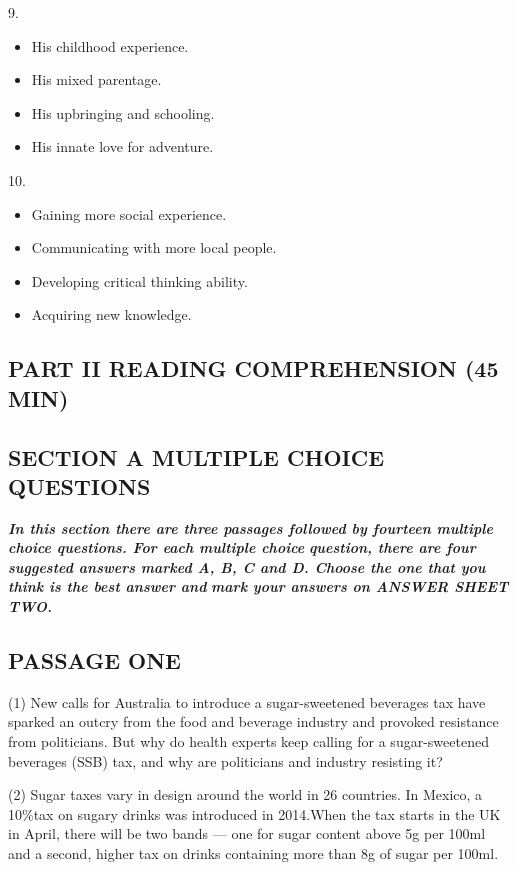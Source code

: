 \documentclass[UTF8,11pt]{ctexart}
\begin{document}
9.


\begin{itemize}[leftmargin=2em,itemsep=.2em,topsep=.4em]\item[A.] His childhood experience.
\item[B.] His mixed parentage.
\item[C.] His upbringing and schooling.
\item[D.] His innate love for adventure.
\end{itemize}

10.


\begin{itemize}[leftmargin=2em,itemsep=.2em,topsep=.4em]\item[A.] Gaining more social experience.
\item[B.] Communicating with more local people.
\item[C.] Developing critical thinking ability.
\item[D.] Acquiring new knowledge.
\end{itemize}

\subsection*{\textbf{PART II READING COMPREHENSION (45 MIN)}}


\subsection*{\textbf{SECTION A MULTIPLE CHOICE QUESTIONS}}


\textbf{\textit{In this section there are three passages followed by fourteen multiple choice questions. For each multiple choice}} \textbf{\textit{question, there are four suggested answers marked A, B, C and D. Choose the one that you think is the best answer and}} \textbf{\textit{mark your answers on ANSWER SHEET TWO.}}


\subsection*{\textbf{PASSAGE ONE}}


(1) New calls for Australia to introduce a sugar-sweetened beverages tax have sparked an outcry from the food and beverage industry and provoked resistance from politicians. But why do health experts keep calling for a sugar-sweetened beverages (SSB) tax, and why are politicians and industry resisting it?


(2) Sugar taxes vary in design around the world in 26 countries. In Mexico, a 10\%tax on sugary drinks was introduced in 2014.When the tax starts in the UK in April, there will be two bands — one for sugar content above 5g per 100ml and a second, higher tax on drinks containing more than 8g of sugar per 100ml.
\end{document}

